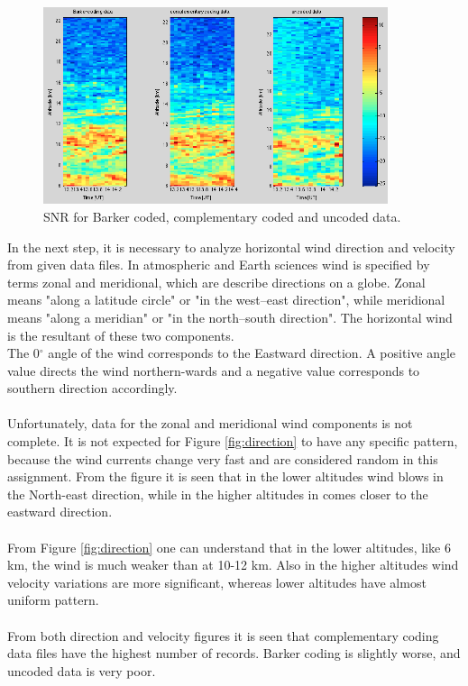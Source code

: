 \documentclass{article}
\begin{document}
\begin{figure}[htb]
\centering
\includegraphics[width=0.9\textwidth]{Figures/SNR_coding.png}
\caption{SNR for Barker coded, complementary coded and uncoded data.}
\label{fig:SNR_coding}
\end{figure}

In the next step, it is necessary to analyze horizontal wind direction and velocity from given data files. In atmospheric and Earth sciences wind is specified by terms zonal and meridional, which are describe directions on a globe. Zonal means "along a latitude circle" or "in the west–east direction", while meridional means "along a meridian" or "in the north–south direction". The horizontal wind is the resultant of these two components. \cite{Wiki:2012zm}\\ The 0$^{\circ}$ angle of the wind corresponds to the Eastward direction. A positive angle value directs the wind northern-wards and a negative value corresponds to southern direction accordingly.\\
\\
Unfortunately, data for the zonal and meridional wind components is not complete. It is not expected for Figure \ref{fig:direction} to have any specific pattern, because the wind currents change very fast and are considered random in this assignment. From the figure it is seen that in the lower altitudes wind blows in the North-east direction, while in the higher altitudes in comes closer to the eastward direction.\\
\\
From Figure \ref{fig:direction} one can understand that in the lower altitudes, like 6 km, the wind is much weaker than at 10-12 km. Also in the higher altitudes wind velocity variations are more significant, whereas lower altitudes have almost uniform pattern.\\
\\
From both direction and velocity figures it is seen that complementary coding data files have the highest number of records. Barker coding is slightly worse, and uncoded data is very poor.
\end{document}
